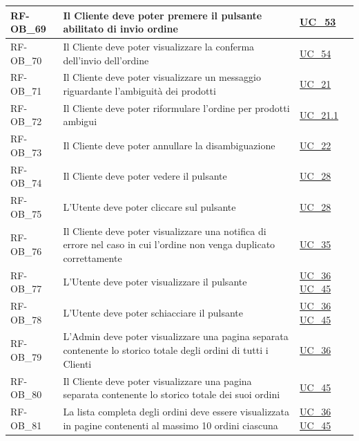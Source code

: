 \begin{longtable}{|>{\raggedright}p{}|>{\raggedright\arraybackslash}p{}|>{\raggedright\arraybackslash}p{}|}
	\hline
	RF-OB\_69 \hypertarget{rf-ob_69} & Il Cliente deve poter premere il pulsante abilitato di invio ordine & \hyperref[uc_53]{UC\_53} \\
	\hline
	RF-OB\_70 \hypertarget{rf-ob_70} & Il Cliente deve poter visualizzare la conferma dell'invio dell'ordine & \hyperref[uc_54]{UC\_54}\\
	\hline
	RF-OB\_71 \hypertarget{rf-ob_71} & Il Cliente deve poter visualizzare un messaggio riguardante l'ambiguità dei prodotti & \hyperref[uc_21]{UC\_21} \\
	\hline
	RF-OB\_72 \hypertarget{rf-ob_72} & Il Cliente deve poter riformulare l'ordine per prodotti ambigui & \hyperref[uc_21.1]{UC\_21.1} \\
	\hline
	RF-OB\_73 \hypertarget{rf-ob_73} & Il Cliente deve poter annullare la disambiguazione & \hyperref[uc_22]{UC\_22} \\
	\hline
	RF-OB\_74 \hypertarget{rf-ob_74} & Il Cliente deve poter vedere il pulsante \vr{Nuova chat} & \hyperref[uc_28]{UC\_28} \\
	\hline
	RF-OB\_75 \hypertarget{rf-ob_75} & L'Utente deve poter cliccare sul pulsante \vr{Nuova chat} & \hyperref[uc_28]{UC\_28} \\
	\hline
	RF-OB\_76 \hypertarget{rf-ob_76} & Il Cliente deve poter visualizzare una notifica di errore nel caso in cui l'ordine non venga duplicato correttamente & \hyperref[uc_35]{UC\_35} \\
	\hline
	RF-OB\_77 \hypertarget{rf-ob_77} & L'Utente deve poter visualizzare il pulsante \vr{visualizza storico ordini} & \hyperref[uc_36]{UC\_36} \newline \hyperref[uc_45]{UC\_45} \\
	\hline
	RF-OB\_78 \hypertarget{rf-ob_78} & L'Utente deve poter schiacciare il pulsante \vr{visualizza storico ordini} & \hyperref[uc_36]{UC\_36} \newline \hyperref[uc_45]{UC\_45} \\
	\hline
	RF-OB\_79 \hypertarget{rf-ob_79} & L'Admin deve poter visualizzare una pagina separata contenente lo storico totale degli ordini di tutti i Clienti & \hyperref[uc_36]{UC\_36} \\
	\hline
	RF-OB\_80 \hypertarget{rf-ob_80} & Il Cliente deve poter visualizzare una pagina separata contenente lo storico totale dei suoi ordini & \hyperref[uc_45]{UC\_45} \\
	\hline
	RF-OB\_81 \hypertarget{rf-ob_81} & La lista completa degli ordini deve essere visualizzata in pagine contenenti al massimo 10 ordini ciascuna & \hyperref[uc_36]{UC\_36} \newline \hyperref[uc_45]{UC\_45} \\

\end{longtable}
